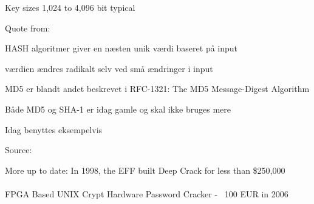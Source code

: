 \documentclass[Screen16to9,17pt]{foils}
\begin{document}
\begin{list2}
\item Key sizes 1,024 to 4,096 bit typical
\item  Quote from: 
\end{list2}




\begin{list1}
\item HASH algoritmer giver en næsten unik værdi baseret på input
\item værdien ændres radikalt selv ved små ændringer i input
\item MD5 er blandt andet beskrevet i RFC-1321: The MD5 Message-Digest
  Algorithm
\item Både MD5 og SHA-1 er idag gamle og skal ikke bruges mere
\item Idag benyttes eksempelvis 
\end{list1}



Source: 

{\small
More up to date:  In 1998, the EFF built Deep Crack for less than \$250,000\\
\\
FPGA Based UNIX Crypt Hardware Password Cracker - ~100 EUR in 2006\\
}

\end{document}
